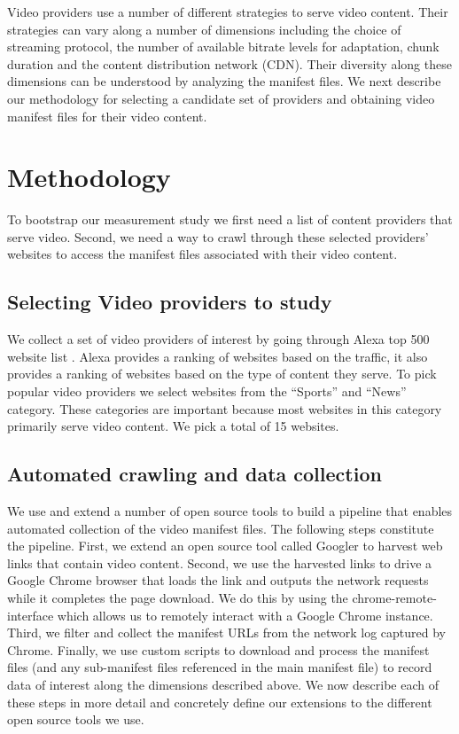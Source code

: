 \documentclass[]{sig-alternate-10pt}
\begin{document}
Video providers use a number of different strategies to serve video
content. Their strategies can vary along a number of dimensions
including the choice of streaming protocol, the number of available
bitrate levels for adaptation, chunk duration and the content
distribution network (CDN). Their diversity along these dimensions can
be understood by analyzing the manifest files. We next describe our
methodology for selecting a candidate set of providers and obtaining
video manifest files for their video content.

\hypertarget{method}{%
\section{Methodology}\label{method}}

To bootstrap our measurement study we first need a list of content
providers that serve video. Second, we need a way to crawl through these
selected providers' websites to access the manifest files associated
with their video content.

\hypertarget{selecting-video-providers-to-study}{%
\subsection{Selecting Video providers to
study}\label{selecting-video-providers-to-study}}

We collect a set of video providers of interest by going through Alexa
top 500 website list \autocite{alexa}. Alexa provides a ranking of
websites based on the traffic, it also provides a ranking of websites
based on the type of content they serve. To pick popular video providers
we select websites from the ``Sports'' and ``News'' category. These
categories are important because most websites in this category
primarily serve video content. We pick a total of 15 websites.

\hypertarget{automated-crawling-and-data-collection}{%
\subsection{Automated crawling and data
collection}\label{automated-crawling-and-data-collection}}

We use and extend a number of open source tools to build a pipeline that
enables automated collection of the video manifest files. The following
steps constitute the pipeline. First, we extend an open source tool
called Googler \autocite{Googler} to harvest web links that contain
video content. Second, we use the harvested links to drive a Google
Chrome browser that loads the link and outputs the network requests
while it completes the page download. We do this by using the
chrome-remote-interface \autocite{ChromeRemoteInterface} which allows us
to remotely interact with a Google Chrome instance. Third, we filter and
collect the manifest URLs from the network log captured by Chrome.
Finally, we use custom scripts to download and process the manifest
files (and any sub-manifest files referenced in the main manifest file)
to record data of interest along the dimensions described above. We now
describe each of these steps in more detail and concretely define our
extensions to the different open source tools we use.
\end{document}
